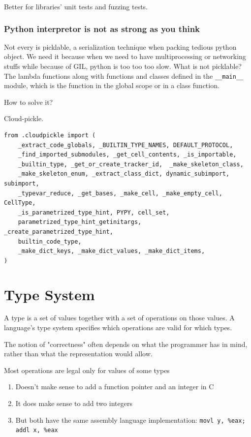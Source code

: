 \documentclass[a4paper]{exam}
\begin{document}
Better for libraries' unit tests and fuzzing tests.

\subsubsection{Python interpretor is not as strong as you think}
Not every is picklable, a serialization technique when packing tedious python object. We need it because when we need to have multiprocessing or networking stuffs while because of GIL, python is too too too slow. What is not picklable?
The lambda functions along with functions and classes defined in the \texttt{\_\_main\_\_} module, which is the function in the global scope or in a class function.

How to solve it?

Cloud-pickle.
\begin{verbatim}
from .cloudpickle import (
    _extract_code_globals, _BUILTIN_TYPE_NAMES, DEFAULT_PROTOCOL,
    _find_imported_submodules, _get_cell_contents, _is_importable,
    _builtin_type, _get_or_create_tracker_id,  _make_skeleton_class,
    _make_skeleton_enum, _extract_class_dict, dynamic_subimport, subimport,
    _typevar_reduce, _get_bases, _make_cell, _make_empty_cell, CellType,
    _is_parametrized_type_hint, PYPY, cell_set,
    parametrized_type_hint_getinitargs, _create_parametrized_type_hint,
    builtin_code_type,
    _make_dict_keys, _make_dict_values, _make_dict_items,
)
\end{verbatim}
\section{Type System}
A type is a set of values together with a set of operations on those values. A language's type system specifies which operations are valid for which types.


The notion of "correctness" often depends on what the programmer has in mind, rather than what the representation would allow.

Most operations are legal only for values of some types
\begin{enumerate}
  \item Doesn't make sense to add a function pointer and an integer in C
  \item It does make sense to add two integers
  \item But both have the same assembly language implementation: \texttt{movl y, \%eax;  addl x, \%eax}
\end{enumerate}
\end{document}
